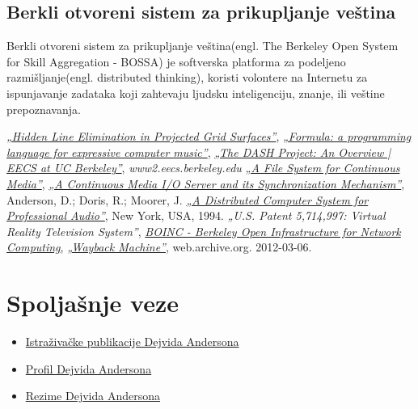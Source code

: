 \documentclass[titlepage, 12pt]{article}
\begin{document}
\subsection{Berkli otvoreni sistem za prikupljanje veština}
Berkli otvoreni sistem za prikupljanje veština(engl. The Berkeley Open System for Skill Aggregation - BOSSA) je softverska platforma za podeljeno razmišljanje(engl. distributed thinking), koristi volontere na Internetu za ispunjavanje zadataka koji zahtevaju ljudsku inteligenciju, znanje, ili veštine prepoznavanja.


\newpage
{}
\appendix
\begin{thebibliography}{9}
  
  \textit{\href{https://dl.acm.org/citation.cfm?id=357313&coll=portal&dl=ACM}{„Hidden Line Elimination in Projected Grid Surfaces”}},
    \textit{\href{https://ieeexplore.ieee.org/document/84829?arnumber=84829}{„Formula: a programming language for expressive computer music”}},
    \textit{\href{https://www2.eecs.berkeley.edu/Pubs/TechRpts/1988/5380.html}{„The DASH Project: An Overview | EECS at UC Berkeley”}},
    \textit{www2.eecs.berkeley.edu}
    \textit{\href{http://portal.acm.org/citation.cfm?id=138875&coll=portal&dl=ACM&CFID=16443802&CFTOKEN=49037775}{„A File System for Continuous Media”}},
    \textit{\href{http://portal.acm.org/citation.cfm?id=125806&dl=ACM&coll=portal&CFID=16443802&CFTOKEN=49037775}{„A Continuous Media I/O Server and its Synchronization Mechanism”}},
    Anderson, D.; Doris, R.; Moorer, J.
    \textit{\href{http://doi.acm.org/10.1145/192593.192702}{„A Distributed Computer System for Professional Audio”}},
    New York, USA,
    1994.
    \textit{„U.S. Patent 5,714,997: Virtual Reality Television System”},
    \textit{\href{https://www.youtube.com/watch?v=8iSRLIK-x6A}{BOINC - Berkeley Open Infrastructure for Network Computing}},
    \textit{\href{https://web.archive.org/web/20120306040156/http://boinc.berkeley.edu/workshop_07.ppt}{„Wayback Machine”}},
    web.archive.org. 2012-03-06. 
\end{thebibliography}
\section{Spoljašnje veze}
\begin{itemize}
    \item \href{https://boinc.berkeley.edu/anderson/pubs_sort.html}{Istraživačke publikacije Dejvida Andersona}
    \item \href{https://boinc.berkeley.edu/anderson/}{Profil Dejvida Andersona}
    \item \href{http://continuum-hypothesis.com/resume.html}{Rezime Dejvida Andersona}
\end{itemize}
\end{document}
